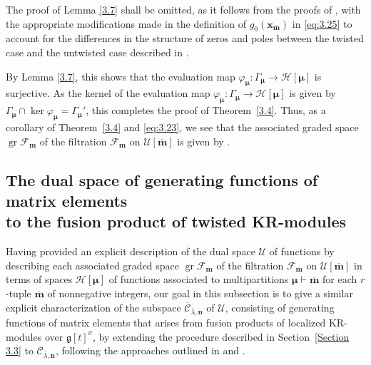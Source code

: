 \documentclass[pdftex]{sigma}
\numberwithin{equation}{section}
\DeclareMathOperator{\gr}{gr}
\begin{document}
The proof of Lemma \ref{3.7} shall be omitted, as it follows from the proofs of \cite[Lemmas 3.11, 3.13, and 3.15]{AKS06}, with the appropriate modifications made in the definition of $g_0(\mathbf{x}_{\overline{\mathbf{m}}})$ in \eqref{eq:3.25} to account for the differences in the structure of zeros and poles between the twisted case and the untwisted case described in \cite{AK07,AKS06}.

By Lemma \ref{3.7}, this shows that the evaluation map $\varphi_{\bm{\mu}}\colon \Gamma_{\bm{\mu}}\to\mathcal{H}[\bm{\mu}]$ is surjective. As the kernel of the evaluation map $\varphi_{\bm{\mu}}\colon \Gamma_{\bm{\mu}}\to\mathcal{H}[\bm{\mu}]$ is given by $\Gamma_{\bm{\mu}}\cap\ker \varphi_{\bm{\mu}}=\Gamma_{\bm{\mu}}'$, this completes the proof of Theorem~\ref{3.4}. Thus, as a corollary of Theorem~\ref{3.4} and \eqref{eq:3.23}, we see that the associated graded space $\gr\mathcal{F}_{\overline{\mathbf{m}}}$ of the filtration $\mathcal{F}_{\overline{\mathbf{m}}}$ on $\mathcal{U}[\overline{\mathbf{m}}]$ is given by
\smash{$
\gr\mathcal{F}_{\overline{\mathbf{m}}}
=\bigoplus_{\bm{\mu}\vdash\overline{\mathbf{m}}}\mathcal{H}[\bm{\mu}]$}.

\subsection[The dual space of generating functions of matrix elements to the fusion product of twisted KR-modules]{The dual space of generating functions of matrix elements\\ to the fusion product of twisted KR-modules}\label{Section 3.4}

Having provided an explicit description of the dual space $\mathcal{U}$ of functions by describing each associated graded space $\gr\mathcal{F}_{\overline{\mathbf{m}}}$ of the filtration $\mathcal{F}_{\overline{\mathbf{m}}}$ on $\mathcal{U}[\overline{\mathbf{m}}]$ in terms of spaces $\mathcal{H}[\bm{\mu}]$ of functions associated to multipartitions $\bm{\mu}\vdash\overline{\mathbf{m}}$ for each $r$-tuple $\overline{\mathbf{m}}$ of nonnegative integers, our goal in this subsection is to give a similar explicit characterization of the subspace $\overline{\mathcal{C}}_{ \overline{\lambda},\mathbf{n}}$ of $\mathcal{U}$, consisting of generating functions of matrix elements that arises from fusion products of localized KR-modules over $\mathfrak{g}[t]^{\sigma}$, by extending the procedure described in Section~\ref{Section 3.3} to $\overline{\mathcal{C}}_{ \overline{\lambda},\mathbf{n}}$, following the approaches outlined in \cite[Section~5.5]{AKS06} and \cite[Section~5.2]{AK07}.
\end{document}

